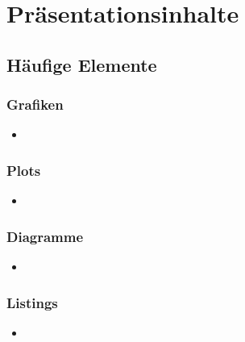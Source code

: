 \documentclass[german,aspectratio=169,notoc,titlestyle=tud,draft]{tudbeamer}%
\begin{document}
\section{Präsentationsinhalte}
\subsection{Häufige Elemente}
\begin{frame}
	\frametitle{Grafiken}

	\begin{itemize}
		\item 
	\end{itemize}

\end{frame}

\begin{frame}
	\frametitle{Plots}

	\begin{itemize}
		\item 
	\end{itemize}

\end{frame}

\begin{frame}
	\frametitle{Diagramme}

	\begin{itemize}
		\item 
	\end{itemize}

\end{frame}

\begin{frame}
	\frametitle{Listings}

	\begin{itemize}
		\item 
	\end{itemize}

\end{frame}
\end{document}
